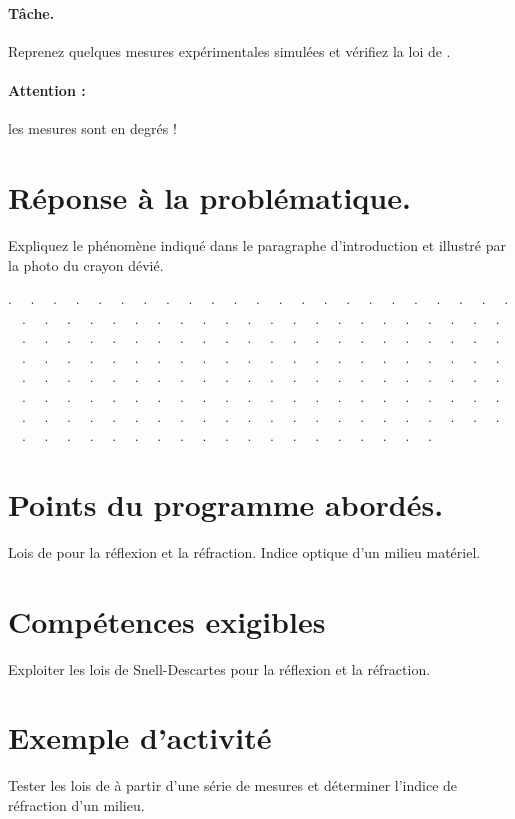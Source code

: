 \documentclass[12pt,a4paper]{article}
\begin{document}
\paragraph{Tâche.} 
Reprenez quelques mesures expérimentales simulées et vérifiez la loi de . 
\paragraph{Attention :} les mesures sont en degrés !

\vfill
\section{Réponse à la problématique.}
Expliquez le phénomène indiqué dans le paragraphe d'introduction et illustré par la photo du crayon dévié.

\noindent . \ \ . \ \ . \ \ . \ \ . \ \ . \ \ . \ \ . \ \ . \ \ . \ \ . \ \ . \ \ . \ \ . \ \ . \ \ . \ \ . \ \ . \ \ . \ \ . \ \ . \ \ . \ \ . \ \ . \ \ . \ \ . \ \ . \ \ . \ \ . \ \ . \ \ . \ \ . \ \ . \ \ . \ \ . \ \ . \ \ . \ \ . \ \ . \ \ . \ \ . \ \ . \ \ . \ \ . \ \ . \ \ . \ \ . \ \ . \ \ . \ \ . \ \ . \ \ . \ \ . \ \ . \ \ . \ \ . \ \ . \ \ . \ \ . \ \ . \ \ . \ \ . \ \ . \ \ . \ \ . \ \ . \ \ . \ \ . \ \ . \ \ . \ \ . \ \ . \ \ . \ \ . \ \ . \ \ . \ \ . \ \ . \ \ . \ \ . \ \ . \ \ . \ \ . \ \ . \ \ . \ \ . \ \ . \ \ . \ \ . \ \ . \ \ . \ \ . \ \ . \ \ . \ \ . \ \ . \ \ . \ \ . \ \ . \ \ . \ \ . \ \ . \ \ . \ \ . \ \ . \ \ . \ \ . \ \ . \ \ . \ \ . \ \ . \ \ . \ \ . \ \ . \ \ . \ \ . \ \ . \ \ . \ \ . \ \ . \ \ . \ \ . \ \ . \ \ . \ \ . \ \ . \ \ . \ \ . \ \ . \ \ . \ \ . \ \ . \ \ . \ \ . \ \ . \ \ . \ \ . \ \ . \ \ . \ \ . \ \ . \ \ . \ \ . \ \ . \ \ . \ \ . \ \ . \ \ . \ \ . \ \ . \ \ . \ \ . \ \ . \ \ . \ \ . \ \ . \ \ . \ \ . \ \ . \ \ . \ \ . \ \ . \ \ . \ \ . \ \ . \ \ . \ \ . \ \ . \ \ . \ \ . \ \ . \ \ . \ \ . \ \ .

\newpage
\section*{Points du programme abordés.}

Lois de  pour la réflexion et la réfraction. 
Indice optique d'un milieu matériel.

\section*{Compétences exigibles}

Exploiter les lois de Snell-Descartes pour la réflexion et la
réfraction.

\section*{Exemple d'activité}
Tester les lois de  à partir d’une série de
mesures et déterminer l’indice de réfraction d’un milieu.
\end{document}
